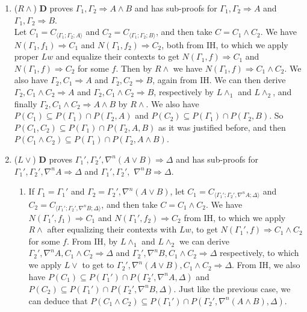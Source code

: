 \begin{enumerate}
	\item ($R\land$) $\mathbf{D}$ proves $\Gamma_1 , \Gamma_2 \Rightarrow A \land B$ and has sub-proofs for $\Gamma_1 , \Gamma_2 \Rightarrow A$ and $\Gamma_1 , \Gamma_2 \Rightarrow B$.\\
	Let $C_1 = C_{\langle\Gamma_1;\Gamma_2;A\rangle}$ and $C_2 = C_{\langle\Gamma_1;\Gamma_2;B\rangle}$, and then take $C = C_1 \land C_2$.
	We have $N(\Gamma_1,f_1) \Rightarrow C_1$ and $N(\Gamma_1,f_2) \Rightarrow C_2$, both from IH, to which we apply proper $Lw$ and equalize their contexts to get $N(\Gamma_1,f) \Rightarrow C_1$ and $N(\Gamma_1,f) \Rightarrow C_2$ for some $f$. Then by $R\land$ we have $N(\Gamma_1,f) \Rightarrow C_1 \land C_2$.
	We also have $\Gamma_2 , C_1 \Rightarrow A$ and $\Gamma_2 , C_2 \Rightarrow B$, again from IH.
	We can then derive $\Gamma_2 , C_1 \land C_2 \Rightarrow A$ and $\Gamma_2 , C_1 \land C_2 \Rightarrow B$, respectively by $L\land_1$ and $L\land_2$, and finally  $\Gamma_2 , C_1 \land C_2 \Rightarrow A \land B$ by $R\land$.
	We also have $P(C_1) \subseteq P(\Gamma_1) \cap P(\Gamma_2 , A)$ and $P(C_2) \subseteq P(\Gamma_1) \cap P(\Gamma_2 , B)$. So $P(C_1 , C_2) \subseteq P(\Gamma_1) \cap P(\Gamma_2 , A , B)$ as it was justified before, and then $P(C_1 \land C_2) \subseteq P(\Gamma_1) \cap P(\Gamma_2 , A \land B)$.

	\item ($L\lor$) $\mathbf{D}$ proves $\Gamma_1' , \Gamma_2' , \nabla^n (A \lor B) \Rightarrow \Delta$ and has sub-proofs for $\Gamma_1' , \Gamma_2' , \nabla^n A \Rightarrow \Delta$ and $\Gamma_1' , \Gamma_2' ,$ $\nabla^n B \Rightarrow \Delta$.
	\begin{enumerate}
		\item If $\Gamma_1 = \Gamma_1'$ and $\Gamma_2 = \Gamma_2' , \nabla^n (A \lor B)$, let $C_1 = C_{\langle\Gamma_1';\Gamma_2',\nabla^n A;\Delta\rangle}$ and $C_2 = C_{\langle\Gamma_1';\Gamma_2',\nabla^n B;\Delta\rangle}$, and then take $C = C_1 \land C_2$.
		We have $N(\Gamma_1',f_1) \Rightarrow C_1$ and $N(\Gamma_1',f_2) \Rightarrow C_2$ from IH, to which we apply $R\land$ after equalizing their contexts with $Lw$, to get $N(\Gamma_1',f) \Rightarrow C_1 \land C_2$ for some $f$.
		From IH, by $L\land_1$ and $L\land_2$ we can derive $\Gamma_2' , \nabla^n A , C_1 \land C_2 \Rightarrow \Delta$ and $\Gamma_2' , \nabla^n B , C_1 \land C_2 \Rightarrow \Delta$ respectively, to which we apply $L\lor$ to get to $\Gamma_2' , \nabla^n (A \lor B) , C_1 \land C_2 \Rightarrow \Delta$.
		From IH, we also have $P(C_1) \subseteq P(\Gamma_1') \cap P(\Gamma_2' , \nabla^n A , \Delta)$ and $P(C_2) \subseteq P(\Gamma_1') \cap P(\Gamma_2' , \nabla^n B , \Delta)$. Just like the previous case, we can deduce that $P(C_1 \land C_2) \subseteq P(\Gamma_1') \cap P(\Gamma_2' , \nabla^n (A \land B) , \Delta)$.


\end{enumerate}
\end{enumerate}
